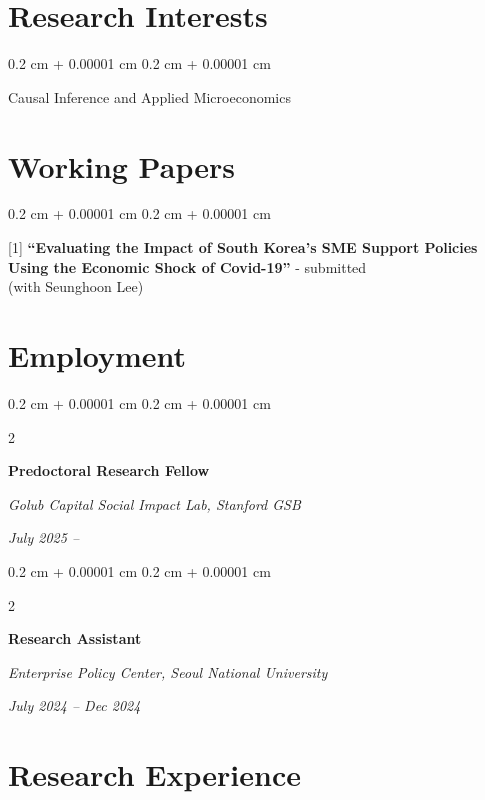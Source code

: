 \documentclass[10pt, letterpaper]{article}
\newenvironment{onecolentry}{
	\begin{adjustwidth}{
			0.2 cm + 0.00001 cm
		}{
			0.2 cm + 0.00001 cm
		}
	}{
	\end{adjustwidth}
} %
\newenvironment{twocolentry}[2][]{
	\onecolentry
	\def\secondColumn{#2}
	\setcolumnwidth{\fill, 4.5 cm}
	\begin{paracol}{2}
	}{
		\switchcolumn \raggedleft \secondColumn
	\end{paracol}
	\endonecolentry
} %
\begin{document}
	
	
	
		\section{Research Interests}
	
	\begin{onecolentry}
Causal Inference and Applied Microeconomics
	\end{onecolentry}
	
	\vspace{12pt}
	
	\section{Working Papers}

	\begin{onecolentry}
		[1] \textbf{``Evaluating the Impact of South Korea’s SME Support Policies Using the Economic Shock of Covid-19''} - submitted \\(with Seunghoon Lee)
	\end{onecolentry}

	
	\vspace{12pt}
	
	\section{Employment}
	
			\begin{twocolentry}{
			\textit{July 2025 –}    
			
			\textit{}}
		\textbf{Predoctoral Research Fellow}
		
		\textit{Golub Capital Social Impact Lab, Stanford GSB}
	\end{twocolentry}
	
	\vspace{0.20cm}
		\begin{twocolentry}{
			\textit{July 2024 – Dec 2024}    
			
			\textit{}}
		\textbf{Research Assistant}
		
		\textit{Enterprise Policy Center, Seoul National University}
	\end{twocolentry}
	
	
	
	\vspace{12pt}
	
	\section{Research Experience}
	
\end{document}
